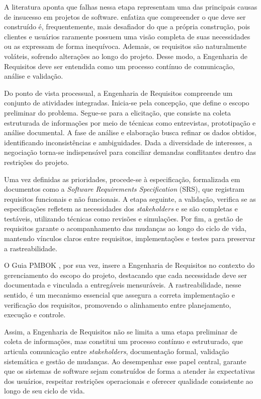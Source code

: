 A literatura aponta que falhas nessa etapa representam uma das principais causas de insucesso em projetos de software.  enfatiza que compreender o que deve ser construído é, frequentemente, mais desafiador do que a própria construção, pois clientes e usuários raramente possuem uma visão completa de suas necessidades ou as expressam de forma inequívoca. Ademais, os requisitos são naturalmente voláteis, sofrendo alterações ao longo do projeto. Desse modo, a Engenharia de Requisitos deve ser entendida como um processo contínuo de comunicação, análise e validação.

Do ponto de vista processual, a Engenharia de Requisitos compreende um conjunto de atividades integradas. Inicia-se pela concepção, que define o escopo preliminar do problema. Segue-se para a elicitação, que consiste na coleta estruturada de informações por meio de técnicas como entrevistas, prototipação e análise documental. A fase de análise e elaboração busca refinar os dados obtidos, identificando inconsistências e ambiguidades. Dada a diversidade de interesses, a negociação torna-se indispensável para conciliar demandas conflitantes dentro das restrições do projeto.

Uma vez definidas as prioridades, procede-se à especificação, formalizada em documentos como a \textit{Software Requirements Specification} (SRS), que registram requisitos funcionais e não funcionais. A etapa seguinte, a validação, verifica se as especificações refletem as necessidades dos \textit{stakeholders} e se são completas e testáveis, utilizando técnicas como revisões e simulações. Por fim, a gestão de requisitos garante o acompanhamento das mudanças ao longo do ciclo de vida, mantendo vínculos claros entre requisitos, implementações e testes para preservar a rastreabilidade.

O Guia PMBOK \textit{\cite{pmi2008}}, por sua vez, insere a Engenharia de Requisitos no contexto do gerenciamento do escopo do projeto, destacando que cada necessidade deve ser documentada e vinculada a entregáveis mensuráveis. A rastreabilidade, nesse sentido, é um mecanismo essencial que assegura a correta implementação e verificação dos requisitos, promovendo o alinhamento entre planejamento, execução e controle.

Assim, a Engenharia de Requisitos não se limita a uma etapa preliminar de coleta de informações, mas constitui um processo contínuo e estruturado, que articula comunicação entre \textit{stakeholders}, documentação formal, validação sistemática e gestão de mudanças. Ao desempenhar esse papel central, garante que os sistemas de software sejam construídos de forma a atender às expectativas dos usuários, respeitar restrições operacionais e oferecer qualidade consistente ao longo de seu ciclo de vida.

